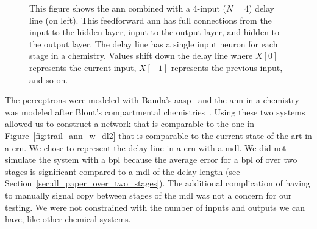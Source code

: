 \begin{figure}
\caption[Delay Line with ANN in Chemistry]{This figure shows the \gls{ann} combined with a 4-input ($N=4$) delay line (on left). This feedforward \gls{ann} has full connections from the input to the hidden layer, input to the output layer, and hidden to the output layer. The delay line has a single input neuron for each stage in a chemistry. Values shift down the delay line where $X[0]$ represents the current input, $X[-1]$ represents the previous input, and so on.}
\label{fig:chem_trail_ann_dl4}
\end{figure}

The perceptrons were modeled with Banda's \gls{aasp}~\cite{Banda2014-kg} and the \gls{ann} in a chemistry was modeled after Blout's compartmental chemistries~\cite{Blount_undated-ro}. Using these two systems allowed us to construct a network that is comparable to the one in Figure~\ref{fig:trail_ann_w_dl2} that is comparable to the current state of the art in a \gls{crn}. We chose to represent the delay line in a \gls{crn} with a \gls{mdl}. We did not simulate the system with a \gls{bpl} because the average error for a \gls{bpl} of over two stages is significant compared to a \gls{mdl} of the delay length (see Section~\ref{sec:dl_paper_over_two_stages}). The additional complication of having to manually signal copy between stages of the \gls{mdl} was not a concern for our testing. We were not constrained with the number of inputs and outputs we can have, like other chemical systems.

